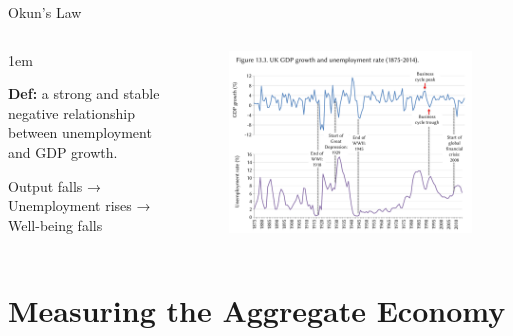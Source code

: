 \documentclass[11pt,aspectratio=43,usenames,dvipsnames]{beamer}
\let\olditemize=\itemize
\let\endolditemize=\enditemize
\renewenvironment{itemize}{\olditemize \itemsep1em}{\endolditemize}
\theoremstyle{definition}
\begin{document}
\begin{frame}{Okun's Law}
\label{slide:Okun_s_Law}
    \begin{columns}
        \begin{column}{0.3\textwidth}
            \begin{itemize}
                \item \textbf{Def:} a strong and stable \alert{negative} relationship between unemployment and GDP growth.
                \item Output falls → Unemployment rises → Well-being falls
            \end{itemize}
        \end{column}
        \begin{column}{0.7\textwidth}
            \begin{figure}
                \centering
                \includegraphics[width=\textwidth]{./figures/3.pdf}
            \end{figure}

        \end{column}
    \end{columns}

\end{frame}

\section[\faBalanceScale]{Measuring the Aggregate Economy}
\label{sec:Measuring_the_Aggregate_Economy}
\end{document}
